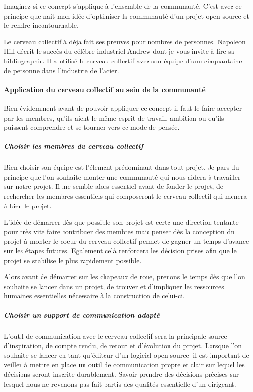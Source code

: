 			Imaginez si ce concept s'applique à l'ensemble de la communauté. C'est avec ce principe que nait mon idée d'optimiser la communauté d'un projet open source et le rendre incontournable.

			Le cerveau collectif à déja fait ses preuves pour nombres de personnes. Napoleon Hill décrit le succès du célèbre industriel Andrew  dont je vous invite à lire sa bibliographie. Il a utilisé le cerveau collectif avec son équipe d'une cinquantaine de personne dans l'industrie de l'acier.

			\paragraph{Application du cerveau collectif au sein de la communauté\\}

			Bien évidemment avant de pouvoir appliquer ce concept il faut le faire accepter par les membres, qu'ils aient le même esprit de travail, ambition ou qu'ils puissent comprendre et se tourner vers ce mode de pensée.

				\subparagraph{Choisir les membres du cerveau collectif\\}

					Bien choisir son équipe est l'élement prédominant dans tout projet. Je pars du principe que l'on souhaite monter une communauté qui nous aidera à travailler sur notre projet. Il me semble alors essentiel avant de fonder le projet, de rechercher les membres essentiels qui composeront le cerveau collectif qui menera à bien le projet.

					L'idée de démarrer dès que possible son projet est certe une direction tentante pour très vite faire contribuer des membres mais penser dès la conception du projet à monter le coeur du cerveau collectif permet de gagner un temps d'avance sur les étapes futures. Egalement celà renforcera les décision prises afin que le projet se stabilise le plus rapidement possible.

					Alors avant de démarrer sur les chapeaux de roue, prenons le temps dès que l'on souhaite se lancer dans un projet, de trouver et d'impliquer les ressources humaines essentielles nécessaire à la construction de celui-ci. 

				\subparagraph{Choisir un support de communication adapté\\}

					L'outil de communication avec le cerveau collectif sera la principale source d'inspiration, de compte rendu, de retour et d'évolution du projet.
					Lorsque l'on souhaite se lancer en tant qu'éditeur d'un logiciel open source, il est important de veiller à mettre en place un outil de communication propre et clair sur lequel les décisions seront inscrite durablement.
					Savoir prendre des décisions précises sur lesquel nous ne revenons pas fait partis des qualités essentielle d'un dirigeant.

